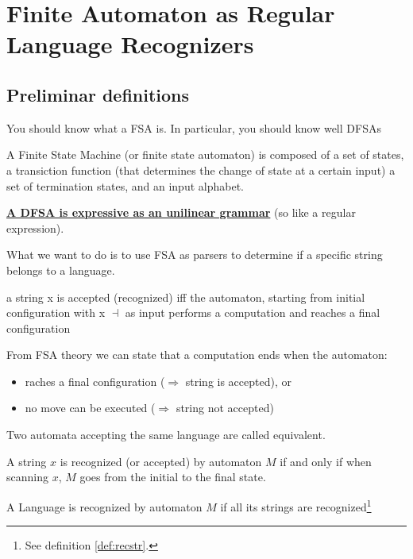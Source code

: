 \chapter{Finite Automaton as Regular Language Recognizers}
	\section{Preliminar definitions}
	You should know what a FSA is. In particular, you should know well DFSAs

	A Finite State Machine (or finite state automaton) is composed of a set of states, a transiction function (that determines the change of state at a certain input) a 
	set of termination states, and an input alphabet.

	\textbf{\underline{A DFSA is expressive as an unilinear grammar}} (so like a regular expression).

	What we want to do is to use FSA as parsers to determine if a specific string belongs to a language.
	\begin{definition}
		a string x is accepted (recognized) iff the automaton,
		starting from initial configuration with x $\dashv$ as input
		performs a computation and reaches a final configuration
	\end{definition}

	From FSA theory we can state that a computation ends when the automaton:
	\begin{itemize}
		\item raches a final configuration ($\Rightarrow$ string is accepted), or
		\item no move can be executed ($\Rightarrow$ string not accepted)
	\end{itemize}

	\begin{definition}
		Two automata accepting the same language are called equivalent.
	\end{definition}

	\begin{definition}\label{def:recstr}
		A string $x$ is recognized (or accepted) by automaton $M$ if and only if when scanning $x$, $M$ goes from the initial to the final state.
	\end{definition}

	\begin{definition}
		A Language is recognized by automaton $M$ if all its strings are recognized\footnote{See definition \ref{def:recstr}.}
	\end{definition}

